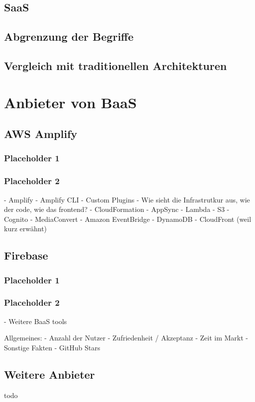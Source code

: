 \subsection{\acl{SaaS}}

\subsection{Abgrenzung der Begriffe}

\subsection{Vergleich mit traditionellen Architekturen}

\section{Anbieter von \acl{BaaS}}

\subsection{AWS Amplify}

\subsubsection{Placeholder 1}
\subsubsection{Placeholder 2}

\autocite{dahunsi2021commercial}
\autocite{amplifyDocs}
\autocite{lysakov2021security}
\autocite{mathew2014overview}
\autocite{beach2014aws}

  - Amplify
  - Amplify CLI
  - Custom Plugins
  - Wie sieht die Infrastrutkur aus, wie der code, wie das frontend?
  - CloudFormation
  - AppSync
  - Lambda
  - S3
  - Cognito
  - MediaConvert
  - Amazon EventBridge
  - DynamoDB
  - CloudFront (weil kurz erwähnt)

\subsection{Firebase}

\subsubsection{Placeholder 1}
\subsubsection{Placeholder 2}

\autocite{moroney2017definitive}
\autocite{firebaseDocs}
\autocite{tanna2018serverless}

- Weitere BaaS tools

Allgemeines:
  - Anzahl der Nutzer
  - Zufriedenheit / Akzeptanz
  - Zeit im Markt
  - Sonstige Fakten
  - GitHub Stars

\subsection{Weitere Anbieter}

todo